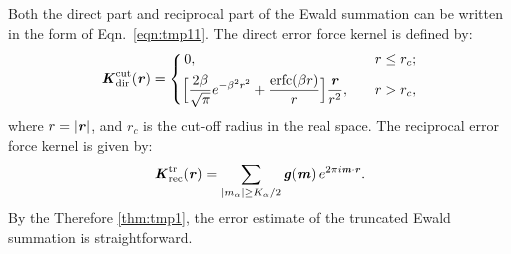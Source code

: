 \documentclass[aps,pre,preprint]{revtex4}
\renewcommand{\v}[1]{\textbf{\textit{#1}}}
\begin{document}
Both the direct part and reciprocal part of the Ewald summation can be
written in the form of Eqn.~\eqref{eqn:tmp11}.  The direct
error force kernel is defined by:
\begin{align}
  \v K^{\textrm{cut}}_{\textrm{dir}}(\v r) =
  \left\{
    \begin{aligned}
      &\,0, &\quad & r \leq r_c;\\
      &
      \Big[
      \frac{2\beta}{\sqrt\pi} e^{-\beta^2r^2} + \frac{\textrm{erfc}(\beta r)}{r}
      \Big]\frac{\v r}{r^2}
      ,& & r > r_c,
    \end{aligned}
  \right.
\end{align}
where $r = \vert\v r\vert$, and $r_c$ is the cut-off radius in the
real space.
The reciprocal error force kernel is given by:
\begin{align}
  \v K^{\textrm{tr}}_{\textrm{rec}}(\v r) =
  \sum_{
      \vert m_\alpha\vert \geq K_\alpha/2}
  \v g(\v m) \,
  e^{2\pi i\v m\cdot\v r}.
\end{align}
By the Therefore \ref{thm:tmp1}, the error estimate of the
truncated Ewald summation is straightforward.


\end{document}
